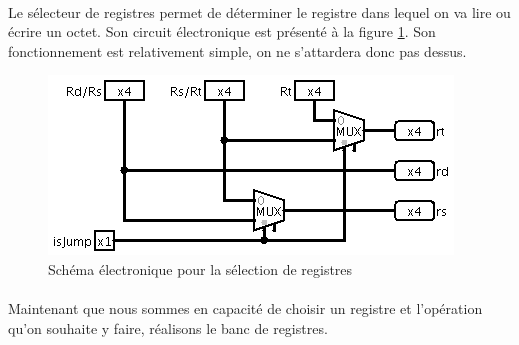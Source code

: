 \paragraph{}{
	Le sélecteur de registres permet de déterminer le registre
	dans lequel on va lire ou écrire un octet. Son circuit électronique
	est présenté à la figure \ref{selec_reg_circ}.
	Son fonctionnement est relativement simple, on ne s’attardera donc
	pas dessus.
}

\begin{figure}[!h]
	\centering
	\includegraphics[scale=0.8,origin=c]{circuits/selec_reg.png}
	\caption{\label{selec_reg_circ} Sch\'{e}ma \'{e}lectronique pour la s\'{e}lection de registres}
\end{figure}

\paragraph{}{
	Maintenant que nous sommes en capacité de choisir un registre
	et l'opération qu'on souhaite y faire, réalisons le banc de
	registres.
}